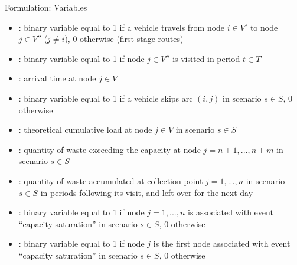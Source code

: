 \documentclass{beamer} %
\theoremstyle{definition} %
\begin{document}
\begin{frame}{Formulation: Variables}
\begin{itemize}
	\item [$x_{ij}$]: binary variable equal to 1 if a vehicle travels from node $i \in V' $ to node $j \in V''$ ($j\neq i$), $0$ otherwise (first stage routes)
	\item [$U_{jt}$]: binary variable equal to 1 if node $j\in V''$ is visited in period $t \in T$
	\item [$\bar{T}_j$]: arrival time at node $j\in V$ 
	\item  [$y_{ij}^s$]: binary variable equal to 1 if a vehicle skips arc $(i,j)$ in scenario $s \in S$, $0$ otherwise 
	\item [$Q_j^s$]: theoretical cumulative load at node $j\in V$ in scenario $s \in S$
	\item [$R_j^s$]: quantity of waste exceeding the capacity at node $j=n+1,...,n+m$ in scenario $s \in S$
	\item [$L_j^s$]: quantity of waste accumulated at collection point $j=1,...,n$ in scenario $s \in S$ in periods following its visit, and left over for the next day
	\item [$\rho_j^s$]: binary variable equal to 1 if node $j=1,...,n$ is associated with  event ``capacity saturation'' in scenario $s\in S$, $0$ otherwise 
	\item [$\alpha_j^s$]: binary variable equal to 1 if node $j$ is the first node associated with  event ``capacity saturation'' in scenario $s\in S$, $0$ otherwise
\end{itemize}
	
\end{frame}
\end{document}
